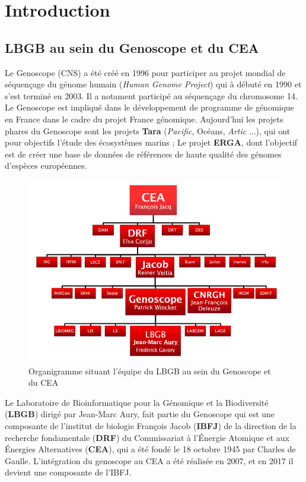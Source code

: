 \section{Introduction}
\subsection{LBGB au sein du Genoscope et du CEA}
Le Genoscope (CNS) a été créé en 1996 pour participer au projet mondial de séquençage du génome humain (\emph{Human Genome Project}) qui à débuté en 1990 et s'est terminé en 2003. Il a notament participé au séquençage du chromosome 14. Le Genoscope est impliqué dans le développement de programme de génomique en France dans le cadre du projet France génomique. Aujourd'hui les projets phares du Genoscope sont les projets \textbf{Tara} (\emph{Pacific}, Océans, \emph{Artic} ...), qui ont pour objectifs l'étude des écosystèmes marins ; Le projet \textbf{ERGA}, dont l'objectif est de créer une base de données de références de haute qualité des génomes d'espèces européennes.

\begin{minipage}{0.45\textwidth}
\begin{figure}[H]
    \includegraphics[width=1.1\textwidth]{img/organigramme.png}
    \caption{Organigramme situant l’équipe du LBGB au sein du Genoscope et du CEA}
    \label{organigramme_LBGB}
\end{figure}
\end{minipage} 
\hfill
\begin{minipage}{0.45\textwidth}
    Le Laboratoire de Bioinformatique pour la Génomique et la Biodiversité (\textbf{LBGB}) dirigé par Jean-Marc Aury, fait partie du Genoscope qui est une composante de l'institut de biologie François Jacob (\textbf{IBFJ}) de la direction de la recherche fondamentale (\textbf{DRF}) du Commissariat à l'Énergie Atomique et aux Énergies Alternatives (\textbf{CEA}), qui a été fondé le 18 octobre 1945 par Charles de Gaulle. L'intégration du genoscope au CEA a été réalisée en 2007, et en 2017 il devient une composante de l'IBFJ.
\end{minipage}


